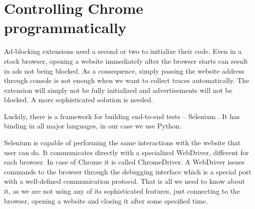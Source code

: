 \section{Controlling Chrome programmatically}

Ad-blocking extensions need a second or two to initialize their code. Even in a stock browser,
opening a website immediately after the browser starts can result in ads not being blocked.
As a consequence, simply passing the website address through console is not enough 
when we want to collect traces automatically. The extension will simply not be fully initialized
and advertisements will not be blocked. A more sophisticated solution is needed.

Luckily, there is a framework for building end-to-end tests -- Selenium \cite{selenium-python}. 
It has binding in all major languages, in our case we use Python.

Selenium is capable of performing the same interactions with the website that user can do.
It communicates directly with a specialized WebDriver, different for each browser.
In case of Chrome it is called ChromeDriver. A WebDriver issues commands to the browser through
the debugging interface which is a special port with a well-defined communication protocol.
That is all we need to know about it, as we are not using any of its sophisticated features, 
just connecting to the browser, opening a website and closing it after some specified time.
